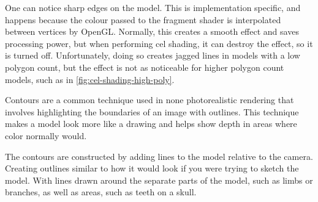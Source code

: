 One can notice sharp edges on the model. This is implementation specific, and happens because the 
colour passed to the fragment shader is interpolated between vertices by OpenGL. Normally, this creates 
a smooth effect and saves processing power, but when performing cel shading, it can destroy the effect, 
so it is turned off. Unfortunately, doing so creates jagged lines in models with a low polygon count, 
but the effect is  not as noticeable for higher polygon count models, such as in 
\autoref{fig:cel-shading-high-poly}. 

\newpage 

Contours are a common technique used in none photorealistic rendering that involves highlighting 
the boundaries of an image with outlines. This technique makes a model look more like a drawing 
and helps show depth in areas where color normally would.

The contours are constructed by adding lines to the model relative to the camera. Creating outlines 
similar to how it would look if you were trying to sketch the model. With lines drawn around the 
separate parts of the model, such as limbs or branches, as well as areas, such as teeth on a skull.

